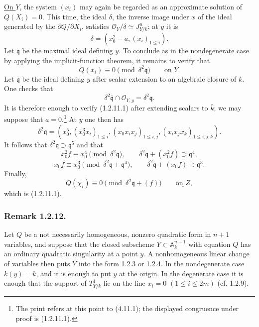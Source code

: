 \underline{On $Y$}, the system $(x_i)$ may again be regarded as an
approximate solution of $Q(X_i)=0$.  This time, the ideal $\delta$,
the inverse image under $x$ of the ideal generated by the
$\partial Q/\partial X_i$, satisfies
$\mathcal O_Y/\delta\simeq J^n_{Y/k}$; at $y$ it is
\[
\delta=(x_0^2-a,(x_i)_{1\leq i}).
\]
Let $\mathfrak q$ be the maximal ideal defining $y$.  To conclude as
in the nondegenerate case by applying the implicit-function theorem,
it remains to verify that
\begin{equation}\tag{1.2.11.1}
Q(x_i)\equiv0\pmod{\delta^2\mathfrak q}
\qquad\underline{\text{on }Y}.
\end{equation}
Let $\bar{\mathfrak q}$ be the ideal defining $y$ after scalar
extension to an algebraic closure of $k$.  One checks that
\[
\delta^2\bar{\mathfrak q}\cap\mathcal O_{Y,y}
=\delta^2\mathfrak q.
\]
It is therefore enough to verify (1.2.11.1) after extending scalars
to $\bar k$; we may suppose that $a=0$.\footnote{The print refers at
this point to (4.11.1); the displayed congruence under proof is
(1.2.11.1).}
At $y$ one then has
\[
\delta^2\mathfrak q=
(x_0^5,(x_0^3x_i)_{1\leq i},
 (x_0x_ix_j)_{1\leq i,j},
 (x_ix_jx_k)_{1\leq i,j,k}).
\]
It follows that $\delta^2\mathfrak q\supset\mathfrak q^5$ and that
\[
x_0^2f\equiv x_0^4\pmod{\delta^2\mathfrak q},
\qquad
\delta^2\mathfrak q+(x_0^2f)\supset\mathfrak q^4,
\]
\[
x_0f\equiv x_0^3
 \pmod{\delta^2\mathfrak q+\mathfrak q^4},
\qquad
\delta^2\mathfrak q+(x_0f)\supset\mathfrak q^3.
\]
Finally,
\[
Q(\chi_i)\equiv0\pmod{\delta^2\mathfrak q+(f)}
\qquad\underline{\text{on }Z},
\]
which is (1.2.11.1).

\subsubsection*{Remark 1.2.12.}
Let $Q$ be a not necessarily homogeneous, nonzero quadratic form in
$n+1$ variables, and suppose that the closed subscheme
$Y\subset\mathbb A_k^{n+1}$ with equation $Q$ has an ordinary
quadratic singularity at a point $y$.  A nonhomogeneous linear change
of variables then puts $Y$ into the form 1.2.3 or 1.2.4.  In the
nondegenerate case $k(y)=k$, and it is enough to put $y$ at the
origin.  In the degenerate case it is enough that the support of
$T^1_{Y/k}$ lie on the line $x_i=0$ $(1\leq i\leq2m)$
(cf. 1.2.9).
